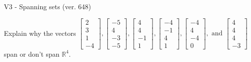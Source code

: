 \begin{exercise}
  \begin{exerciseTitle}V3 - Spanning sets (ver. 648)\end{exerciseTitle}
  \begin{exerciseStatement}
    Explain why the vectors \(\left[\begin{array}{r}
2 \\
3 \\
1 \\
-4
\end{array}\right] , \left[\begin{array}{r}
-5 \\
4 \\
-3 \\
-5
\end{array}\right] , \left[\begin{array}{r}
4 \\
4 \\
-1 \\
1
\end{array}\right] , \left[\begin{array}{r}
-4 \\
-1 \\
4 \\
1
\end{array}\right] , \left[\begin{array}{r}
-4 \\
4 \\
-4 \\
0
\end{array}\right] , \text{ and } \left[\begin{array}{r}
4 \\
4 \\
4 \\
-3
\end{array}\right]\) span or don't span \(\mathbb{R}^4\). 
	



\end{exerciseStatement}
\end{exercise}
